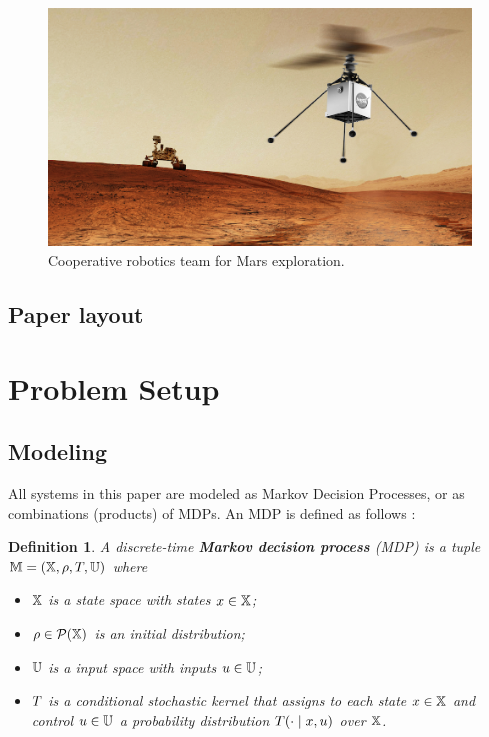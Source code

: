 \documentclass[draft,conference]{IEEEtran}
\newtheorem{definition}{Definition}
\begin{document}
\begin{figure}
  \begin{center}
    \includegraphics[width=0.8\columnwidth]{figs/heli-rover.png}
  \end{center}
  \caption{Cooperative robotics team for Mars exploration.}
  \label{fig:heli-rover}
\end{figure}

\subsection{Paper layout}



\section{Problem Setup}
\label{sec:problem}

\subsection{Modeling}

All systems in this paper are modeled as Markov Decision Processes, or as combinations (products) of MDPs. An MDP is defined as follows \cite{Bertsekas1978}:

\begin{definition}
\label{def:MDP}
  A discrete-time \textbf{Markov decision process} (MDP) is a tuple $\mathbb{M} = (\mathbb{X}, \rho, T, \mathbb{U})$ where
  \begin{itemize}
    \item $\mathbb{X}$ is a state space with states $x\in\mathbb{X}$; %
    \item $\rho \in \mathcal P (\mathbb{X})$ is an initial distribution;
    \item $\mathbb{U}$ is a input space with inputs $u\in\mathbb{U}$;
    \item $T$ is a conditional stochastic kernel that assigns to each state $x\in \mathbb{X}$ and control $u\in \mathbb{U}$ a probability distribution $T(\cdot\mid x,u)$ over $\mathbb{X}$.
  \end{itemize}
\end{definition}
\end{document}
